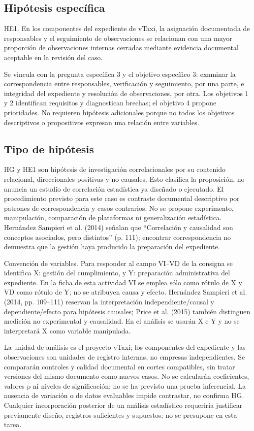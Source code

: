 {\subsection{Hipótesis específica}
HE1. En los componentes del expediente de vTaxi, la asignación documentada de responsables y el seguimiento de observaciones se relacionan con una mayor proporción de observaciones internas cerradas mediante evidencia documental aceptable en la revisión del caso.


Se vincula con la pregunta específica 3 y el objetivo específico 3: examinar la correspondencia entre responsables, verificación y seguimiento, por una parte, e integridad del expediente y resolución de observaciones, por otra. Los objetivos 1 y 2 identifican requisitos y diagnostican brechas; el objetivo 4 propone prioridades. No requieren hipótesis adicionales porque no todos los objetivos descriptivos o propositivos expresan una relación entre variables.


\subsection{Tipo de hipótesis}
HG y HE1 son hipótesis de investigación correlacionales por su contenido relacional, direccionales positivas y no causales. Esto clasifica la proposición, no anuncia un estudio de correlación estadística ya diseñado o ejecutado. El procedimiento previsto para este caso es contraste documental descriptivo por patrones de correspondencia y casos contrarios. No se propone experimento, manipulación, comparación de plataformas ni generalización estadística. Hernández Sampieri et al. (2014) señalan que “Correlación y causalidad son conceptos asociados, pero distintos” (p. 111); encontrar correspondencia no demuestra que la gestión haya producido la preparación del expediente.


Convención de variables. Para responder al campo VI–VD de la consigna se identifica X: gestión del cumplimiento, y Y: preparación administrativa del expediente. En la ficha de esta actividad VI se emplea sólo como rótulo de X y VD como rótulo de Y; no se atribuyen causa y efecto. Hernández Sampieri et al. (2014, pp. 109–111) reservan la interpretación independiente/causal y dependiente/efecto para hipótesis causales; Price et al. (2015) también distinguen medición no experimental y causalidad. En el análisis se usarán X e Y y no se interpretará X como variable manipulada.


La unidad de análisis es el proyecto vTaxi; los componentes del expediente y las observaciones son unidades de registro internas, no empresas independientes. Se compararán controles y calidad documental en cortes compatibles, sin tratar versiones del mismo documento como nuevos casos. No se calcularán coeficientes, valores p ni niveles de significación: no se ha previsto una prueba inferencial. La ausencia de variación o de datos evaluables impide contrastar, no confirma HG. Cualquier incorporación posterior de un análisis estadístico requeriría justificar previamente diseño, registros suficientes y supuestos; no se presupone en esta tarea.


}
